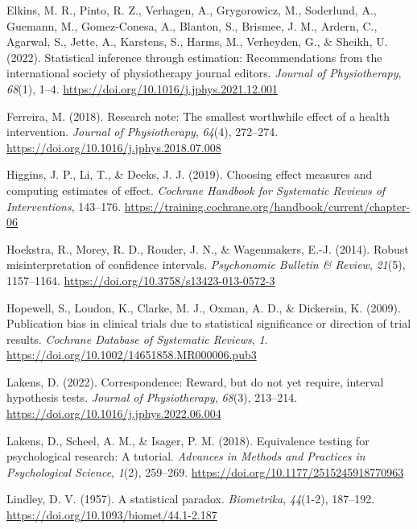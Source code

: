 \documentclass[]{cik}%
\newlength{\cslhangindent}
\newlength{\cslentryspacingunit} %
\newenvironment{CSLReferences}[2] %
 {%
  \setlength{\parindent}{0pt}
  \ifodd #1
  \let\oldpar\par
  \def\par{\hangindent=\cslhangindent\oldpar}
  \fi
  \setlength{\parskip}{#2\cslentryspacingunit}
 }%
 {}
\begin{document}
\begin{CSLReferences}{1}{0}
\leavevmode{}%
Elkins, M. R., Pinto, R. Z., Verhagen, A., Grygorowicz, M., Soderlund,
A., Guemann, M., Gomez-Conesa, A., Blanton, S., Brismee, J. M., Ardern,
C., Agarwal, S., Jette, A., Karstens, S., Harms, M., Verheyden, G., \&
Sheikh, U. (2022). Statistical inference through estimation:
Recommendations from the international society of physiotherapy journal
editors. \emph{Journal of Physiotherapy}, \emph{68}(1), 1--4.
\url{https://doi.org/10.1016/j.jphys.2021.12.001}

\leavevmode{}%
Ferreira, M. (2018). Research note: The smallest worthwhile effect of a
health intervention. \emph{Journal of Physiotherapy}, \emph{64}(4),
272--274. \url{https://doi.org/10.1016/j.jphys.2018.07.008}

\leavevmode{}%
Higgins, J. P., Li, T., \& Deeks, J. J. (2019). Choosing effect measures
and computing estimates of effect. \emph{Cochrane Handbook for
Systematic Reviews of Interventions}, 143--176.
\url{https://training.cochrane.org/handbook/current/chapter-06}

\leavevmode{}%
Hoekstra, R., Morey, R. D., Rouder, J. N., \& Wagenmakers, E.-J. (2014).
Robust misinterpretation of confidence intervals. \emph{Psychonomic
Bulletin \& Review}, \emph{21}(5), 1157--1164.
\url{https://doi.org/10.3758/s13423-013-0572-3}

\leavevmode{}%
Hopewell, S., Loudon, K., Clarke, M. J., Oxman, A. D., \& Dickersin, K.
(2009). Publication bias in clinical trials due to statistical
significance or direction of trial results. \emph{Cochrane Database of
Systematic Reviews}, \emph{1}.
\url{https://doi.org/10.1002/14651858.MR000006.pub3}

\leavevmode{}%
Lakens, D. (2022). Correspondence: Reward, but do not yet require,
interval hypothesis tests. \emph{Journal of Physiotherapy},
\emph{68}(3), 213--214.
\url{https://doi.org/10.1016/j.jphys.2022.06.004}

\leavevmode{}%
Lakens, D., Scheel, A. M., \& Isager, P. M. (2018). Equivalence testing
for psychological research: A tutorial. \emph{Advances in Methods and
Practices in Psychological Science}, \emph{1}(2), 259--269.
\url{https://doi.org/10.1177/2515245918770963}

\leavevmode{}%
Lindley, D. V. (1957). A statistical paradox. \emph{Biometrika},
\emph{44}(1-2), 187--192.
\url{https://doi.org/10.1093/biomet/44.1-2.187}


\end{CSLReferences}
\end{document}
